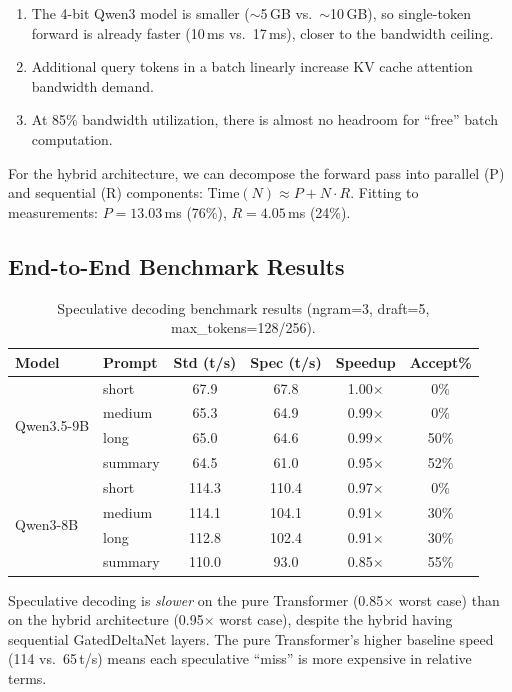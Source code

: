 \documentclass[11pt,a4paper]{article}
\begin{document}
\begin{enumerate}[leftmargin=2em]
  \item The 4-bit Qwen3 model is smaller ($\sim$5\,GB vs.\ $\sim$10\,GB), so single-token forward is already faster (10\,ms vs.\ 17\,ms), closer to the bandwidth ceiling.
  \item Additional query tokens in a batch linearly increase KV cache attention bandwidth demand.
  \item At 85\% bandwidth utilization, there is almost no headroom for ``free'' batch computation.
\end{enumerate}

For the hybrid architecture, we can decompose the forward pass into parallel (P) and sequential (R) components: $\text{Time}(N) \approx P + N \cdot R$. Fitting to measurements: $P = 13.03$\,ms (76\%), $R = 4.05$\,ms (24\%).

\subsection{End-to-End Benchmark Results}

\begin{table}[H]
\centering
\caption{Speculative decoding benchmark results (ngram=3, draft=5, max\_tokens=128/256).}
\label{tab:spec_results}
\begin{tabular}{llcccc}
\toprule
\textbf{Model} & \textbf{Prompt} & \textbf{Std (t/s)} & \textbf{Spec (t/s)} & \textbf{Speedup} & \textbf{Accept\%} \\
\midrule
\multirow{4}{*}{Qwen3.5-9B} & short & 67.9 & 67.8 & 1.00$\times$ & 0\% \\
 & medium & 65.3 & 64.9 & 0.99$\times$ & 0\% \\
 & long & 65.0 & 64.6 & 0.99$\times$ & 50\% \\
 & summary & 64.5 & 61.0 & 0.95$\times$ & 52\% \\
\midrule
\multirow{4}{*}{Qwen3-8B} & short & 114.3 & 110.4 & 0.97$\times$ & 0\% \\
 & medium & 114.1 & 104.1 & 0.91$\times$ & 30\% \\
 & long & 112.8 & 102.4 & 0.91$\times$ & 30\% \\
 & summary & 110.0 & 93.0 & 0.85$\times$ & 55\% \\
\bottomrule
\end{tabular}
\end{table}

Speculative decoding is \emph{slower} on the pure Transformer (0.85$\times$ worst case) than on the hybrid architecture (0.95$\times$ worst case), despite the hybrid having sequential GatedDeltaNet layers. The pure Transformer's higher baseline speed (114 vs.\ 65\,t/s) means each speculative ``miss'' is more expensive in relative terms.
\end{document}
